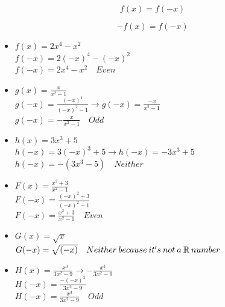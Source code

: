 \begin{definition}
  $$f(x) = f(-x)$$
\end{definition}

\begin{definition}
  $$-f(x) = f(-x)$$
\end{definition}

\begin{example}[Algebraic]
  \hfill
  \begin{itemize}
  \item $f(x) = 2x^4 - x^2$ \\
    $f(-x) = 2(-x)^4 - (-x)^2$ \\
    $f(-x) = 2x^4 - x^2 \quad Even$
  \item $g(x) = \frac{x}{x^2 - 1}$ \\
    $g(-x) = \frac{(-x)^1}{(-x)^2 - 1} \to g(-x) = \frac{-x}{x^2 - 1}$ \\
    $g(-x) = -\frac{x}{x^2 - 1} \quad Odd$
  \item $h(x) = 3x^3 + 5$ \\
    $h(-x) = 3(-x)^3 + 5 \to h(-x) = -3x^3 + 5$ \\
    $h(-x) = -(3x^3 - 5) \quad Neither$
  \item $F(x) = \frac{x^2 + 3}{x^2 - 1}$ \\
    $F(-x) = \frac{(-x)^2 + 3}{(-x)^2 - 1}$ \\
    $F(-x) = \frac{x^2 + 3}{x^2 - 1} \quad Even$
  \item $G(x) = \sqrt{x}$ \\
    $G(-x) = \sqrt{(-x)} \quad Neither\:because\:it's\:not\:a\:\mathbb{R}\:number$ \\
  \item $H(x) = \frac{-x^3}{3x^2 - 9} \to -\frac{x^3}{3x^2 - 9}$ \\
    $H(-x) = \frac{-(-x)^3}{3x^2 - 9}$ \\
    $H(-x) = \frac{x^3}{3x^2 - 9} \quad Odd$
  \end{itemize}
\end{example}
